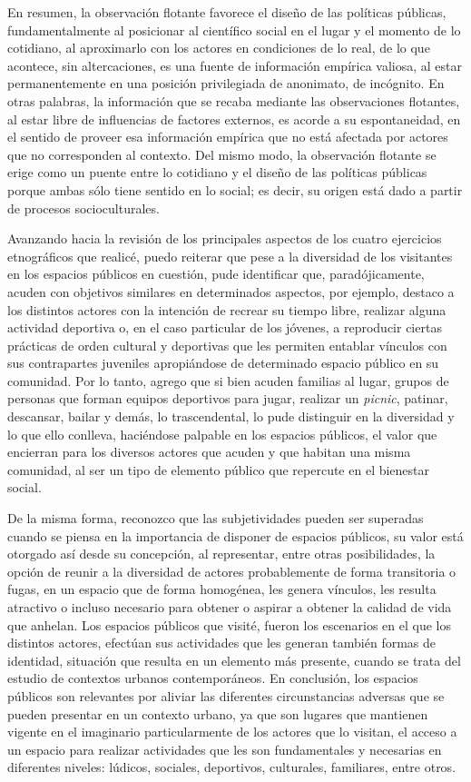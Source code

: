 \documentclass[
  spanish,
  11pt,
  a4paper,
]{scrbook}
\begin{document}
En resumen, la observación flotante favorece el diseño de las políticas
públicas, fundamentalmente al posicionar al científico social en el
lugar y el momento de lo cotidiano, al aproximarlo con los actores en
condiciones de lo real, de lo que acontece, sin altercaciones, es una
fuente de información empírica valiosa, al estar permanentemente en una
posición privilegiada de anonimato, de incógnito. En otras palabras, la
información que se recaba mediante las observaciones flotantes, al estar
libre de influencias de factores externos, es acorde a su espontaneidad,
en el sentido de proveer esa información empírica que no está afectada
por actores que no corresponden al contexto. Del mismo modo, la
observación flotante se erige como un puente entre lo cotidiano y el
diseño de las políticas públicas porque ambas sólo tiene sentido en lo
social; es decir, su origen está dado a partir de procesos
socioculturales.

Avanzando hacia la revisión de los principales aspectos de los cuatro
ejercicios etnográficos que realicé, puedo reiterar que pese a la
diversidad de los visitantes en los espacios públicos en cuestión, pude
identificar que, paradójicamente, acuden con objetivos similares en
determinados aspectos, por ejemplo, destaco a los distintos actores con
la intención de recrear su tiempo libre, realizar alguna actividad
deportiva o, en el caso particular de los jóvenes, a reproducir ciertas
prácticas de orden cultural y deportivas que les permiten entablar
vínculos con sus contrapartes juveniles apropiándose de determinado
espacio público en su comunidad. Por lo tanto, agrego que si bien acuden
familias al lugar, grupos de personas que forman equipos deportivos para
jugar, realizar un \emph{picnic}, patinar, descansar, bailar y demás, lo
trascendental, lo pude distinguir en la diversidad y lo que ello
conlleva, haciéndose palpable en los espacios públicos, el valor que
encierran para los diversos actores que acuden y que habitan una misma
comunidad, al ser un tipo de elemento público que repercute en el
bienestar social.

De la misma forma, reconozco que las subjetividades pueden ser superadas
cuando se piensa en la importancia de disponer de espacios públicos, su
valor está otorgado así desde su concepción, al representar, entre otras
posibilidades, la opción de reunir a la diversidad de actores
probablemente de forma transitoria o fugas, en un espacio que de forma
homogénea, les genera vínculos, les resulta atractivo o incluso
necesario para obtener o aspirar a obtener la calidad de vida que
anhelan. Los espacios públicos que visité, fueron los escenarios en el
que los distintos actores, efectúan sus actividades que les generan
también formas de identidad, situación que resulta en un elemento más
presente, cuando se trata del estudio de contextos urbanos
contemporáneos. En conclusión, los espacios públicos son relevantes por
aliviar las diferentes circunstancias adversas que se pueden presentar
en un contexto urbano, ya que son lugares que mantienen vigente en el
imaginario particularmente de los actores que lo visitan, el acceso a un
espacio para realizar actividades que les son fundamentales y necesarias
en diferentes niveles: lúdicos, sociales, deportivos, culturales,
familiares, entre otros.
\end{document}
